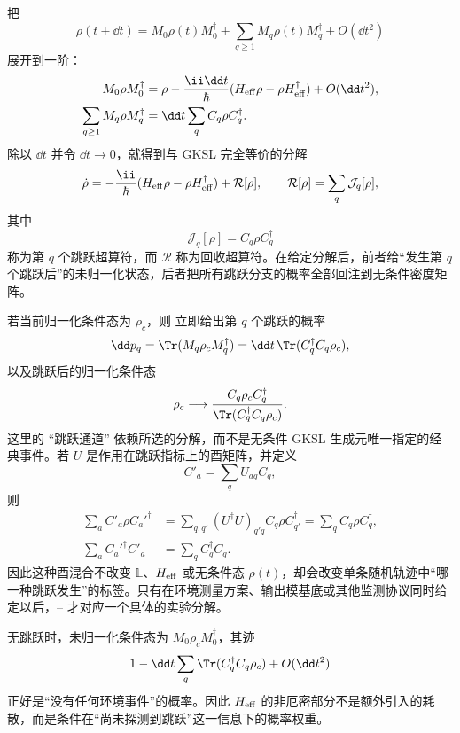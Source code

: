 把
\[
\rho(t+\dd t)=M_0\rho(t)M_0^\dagger
+\sum_{q\ge1}M_q\rho(t)M_q^\dagger+O(\dd t^2)
\]
展开到一阶：
\begin{align}
M_0\rho M_0^\dagger
&=\rho-\frac{\ii\dd t}{\hbar}
(H_{\rm eff}\rho-\rho H_{\rm eff}^\dagger)+O(\dd t^2),\\
\sum_{q\ge1}M_q\rho M_q^\dagger
&=\dd t\sum_q C_q\rho C_q^\dagger.
\end{align}
除以 $\dd t$ 并令 $\dd t\to0$，就得到与 GKSL 完全等价的分解
\begin{equation}
\dot\rho
=-\frac{\ii}{\hbar}
(H_{\rm eff}\rho-\rho H_{\rm eff}^\dagger)
+\mathcal R[\rho],
\qquad
\mathcal R[\rho]=\sum_q\mathcal J_q[\rho],
\label{eq:phys-oqs-heff-recycle}
\end{equation}
其中
\begin{equation}
\mathcal J_q[\rho]=C_q\rho C_q^\dagger
\label{eq:phys-oqs-jump-superoperator}
\end{equation}
称为第 $q$ 个跳跃超算符，而 $\mathcal R$ 称为回收超算符。在给定分解后，前者给“发生第 $q$ 个跳跃后”的未归一化状态，后者把所有跳跃分支的概率全部回注到无条件密度矩阵。

若当前归一化条件态为 $\rho_c$，则 立即给出第 $q$ 个跳跃的概率
\begin{equation}
\dd p_q
=\Tr(M_q\rho_cM_q^\dagger)
=\dd t\,\Tr(C_q^\dagger C_q\rho_c),
\label{eq:phys-oqs-jump-probability}
\end{equation}
以及跳跃后的归一化条件态
\begin{equation}
\rho_c\longrightarrow
\frac{C_q\rho_cC_q^\dagger}
{\Tr(C_q^\dagger C_q\rho_c)}.
\label{eq:phys-oqs-jump-update}
\end{equation}
这里的 ``跳跃通道'' 依赖所选的分解，而不是无条件 GKSL 生成元唯一指定的经典事件。若 $U$ 是作用在跳跃指标上的酉矩阵，并定义
\[
C'_a=\sum_qU_{aq}C_q,
\]
则
\[
\begin{aligned}
\sum_aC'_a\rho C_a'^\dagger
&=\sum_{q,q'}(U^\dagger U)_{q'q}C_q\rho C_{q'}^\dagger
=\sum_qC_q\rho C_q^\dagger,\\
\sum_aC_a'^\dagger C'_a
&=\sum_qC_q^\dagger C_q.
\end{aligned}
\]
因此这种酉混合不改变 $\mathbb L$、$H_{\rm eff}$ 或无条件态 $\rho(t)$，却会改变单条随机轨迹中“哪一种跳跃发生”的标签。只有在环境测量方案、输出模基底或其他监测协议同时给定以后，-- 才对应一个具体的实验分解。

无跳跃时，未归一化条件态为 $M_0\rho_cM_0^\dagger$，其迹
\[
1-\dd t\sum_q\Tr(C_q^\dagger C_q\rho_c)+O(\dd t^2)
\]
正好是“没有任何环境事件”的概率。因此 $H_{\rm eff}$ 的非厄密部分不是额外引入的耗散，而是条件在“尚未探测到跳跃”这一信息下的概率权重。

